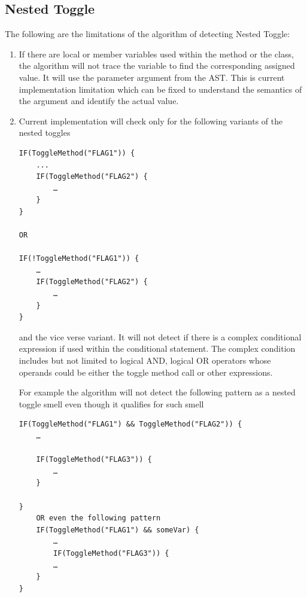 \documentclass[conference]{IEEEtran}
\begin{document}
\subsection{Nested Toggle}
The following are the limitations of the algorithm of detecting Nested Toggle:
\begin{enumerate}
\item{If there are local or member variables used within the method or the class, the algorithm will not trace the variable to find the corresponding assigned value. It will use the parameter argument from the AST. This is current implementation limitation which can be fixed to understand the semantics of the argument and identify the actual value.}
\item{Current implementation will check only for the following variants of the nested toggles

\begin{lstlisting}
IF(ToggleMethod("FLAG1")) {
	...
	IF(ToggleMethod("FLAG2") {
		…
	}
}

OR

IF(!ToggleMethod("FLAG1")) {
	…
	IF(ToggleMethod("FLAG2") {
		…
	}
}\end{lstlisting}

and the vice verse variant. It will not detect if there is a complex conditional expression if used within the conditional statement. The complex condition includes but not limited to logical AND, logical OR operators whose operands could be either the toggle method call or other expressions. 

For example the algorithm will not detect the following pattern as a nested toggle smell even though it qualifies for such smell
\begin{lstlisting}
IF(ToggleMethod("FLAG1") && ToggleMethod("FLAG2")) {
	…

	IF(ToggleMethod("FLAG3")) {
		…
	}

}	
	OR even the following pattern
	IF(ToggleMethod("FLAG1") && someVar) {
		…
		IF(ToggleMethod("FLAG3")) {
		…
	}
}
\end{lstlisting}
}
\end{enumerate}
\end{document}
